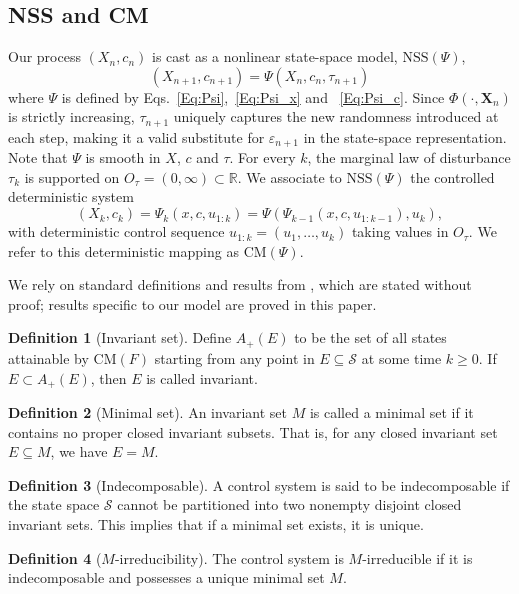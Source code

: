 \documentclass[11pt]{article}
\theoremstyle{definition}
\newtheorem{definition}{Definition}
\begin{document}
\subsection{NSS and CM}

Our process $(X_n,c_n)$ is cast as a nonlinear state-space model, $\mathrm{NSS}(\Psi)$,
\[
(X_{n+1}, c_{n+1}) = \Psi (X_n, c_n, \tau_{n+1})
\]
where $\Psi$ is defined by Eqs.~\eqref{Eq:Psi},~\eqref{Eq:Psi_x} and ~\eqref{Eq:Psi_c}.
Since $\Phi(\cdot, \mathbf{X}_n)$ is strictly increasing, $\tau_{n+1}$ uniquely captures the new randomness introduced at each step, making it a valid substitute for $\varepsilon_{n+1}$ in the state-space representation.
Note that $\Psi$ is smooth in $X$, $c$ and $\tau$. 
For every $k$, the marginal law of disturbance $\tau_k$ is supported on $O_\tau=(0,\infty)\subset\mathbb R$.
We associate to $\mathrm{NSS}(\Psi)$ the controlled deterministic system
$$(X_k, c_k)=\Psi_k(x,c,u_{1:k})=\Psi\left(\Psi_{k-1}(x,c,u_{1:k-1}), u_k \right),$$
with deterministic control sequence $u_{1:k}=(u_1,\dots,u_k)$ taking values in $O_\tau$. 
We refer to this deterministic mapping as $\mathrm{CM}(\Psi)$.

We rely on standard definitions and results from \cite{meyn2009markov}, which are stated without proof; results specific to our model are proved in this paper.


\begin{definition}[Invariant set]
	Define $A_+(E)$ to be the set of all states attainable by $\mathrm{CM}(F)$ starting from any point in $E \subseteq \mathcal S$ at some time $k \geq 0$.
	If $E \subset A_+(E)$, then $E$ is called invariant.
\end{definition}

\begin{definition}[Minimal set]
	An invariant set $M$ is called a minimal set if it contains no proper closed invariant subsets. 
	That is, for any closed invariant set $E \subseteq M$, we have $E = M$.
\end{definition}

\begin{definition}[Indecomposable]
	A control system is said to be indecomposable if the state space $\mathcal S$ cannot be partitioned into two nonempty disjoint closed invariant sets.
	This implies that if a minimal set exists, it is unique.
\end{definition}



\begin{definition}[$M$-irreducibility]
	The control system is $M$-irreducible if it is indecomposable and possesses a unique minimal set $M$.
\end{definition}
\end{document}
